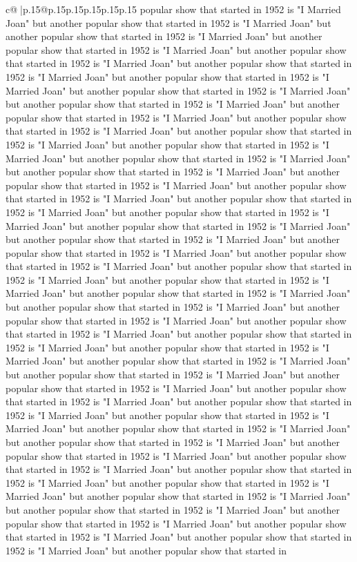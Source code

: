 \documentclass{article}
\begin{document}
{\begin{supertabular}{c@{$\;$}|p{.15\linewidth}@{}p{.15\linewidth}p{.15\linewidth}p{.15\linewidth}p{.15\linewidth}p{.15\linewidth}}
{{{popular show that started in 1952 is "I Married Joan" but another popular show that started in 1952 is "I Married Joan" but another popular show that started in 1952 is "I Married Joan" but another popular show that started in 1952 is "I Married Joan" but another popular show that started in 1952 is "I Married Joan" but another popular show that started in 1952 is "I Married Joan" but another popular show that started in 1952 is "I Married Joan" but another popular show that started in 1952 is "I Married Joan" but another popular show that started in 1952 is "I Married Joan" but another popular show that started in 1952 is "I Married Joan" but another popular show that started in 1952 is "I Married Joan" but another popular show that started in 1952 is "I Married Joan" but another popular show that started in 1952 is "I Married Joan" but another popular show that started in 1952 is "I Married Joan" but another popular show that started in 1952 is "I Married Joan" but another popular show that started in 1952 is "I Married Joan" but another popular show that started in 1952 is "I Married Joan" but another popular show that started in 1952 is "I Married Joan" but another popular show that started in 1952 is "I Married Joan" but another popular show that started in 1952 is "I Married Joan" but another popular show that started in 1952 is "I Married Joan" but another popular show that started in 1952 is "I Married Joan" but another popular show that started in 1952 is "I Married Joan" but another popular show that started in 1952 is "I Married Joan" but another popular show that started in 1952 is "I Married Joan" but another popular show that started in 1952 is "I Married Joan" but another popular show that started in 1952 is "I Married Joan" but another popular show that started in 1952 is "I Married Joan" but another popular show that started in 1952 is "I Married Joan" but another popular show that started in 1952 is "I Married Joan" but another popular show that started in 1952 is "I Married Joan" but another popular show that started in 1952 is "I Married Joan" but another popular show that started in 1952 is "I Married Joan" but another popular show that started in 1952 is "I Married Joan" but another popular show that started in 1952 is "I Married Joan" but another popular show that started in 1952 is "I Married Joan" but another popular show that started in 1952 is "I Married Joan" but another popular show that started in 1952 is "I Married Joan" but another popular show that started in 1952 is "I Married Joan" but another popular show that started in 1952 is "I Married Joan" but another popular show that started in 1952 is "I Married Joan" but another popular show that started in 1952 is "I Married Joan" but another popular show that started in 1952 is "I Married Joan" but another popular show that started in 1952 is "I Married Joan" but another popular show that started in 1952 is "I Married Joan" but another popular show that started in 1952 is "I Married Joan" but another popular show that started in 1952 is "I Married Joan" but another popular show that started in 1952 is "I Married Joan" but another popular show that started in }}}
\end{supertabular}}
\end{document}

